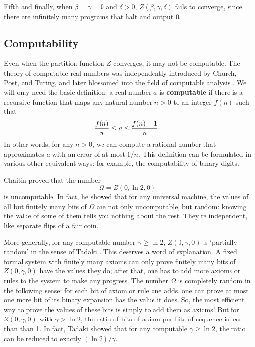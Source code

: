 \documentclass[12pt,twoside,openright]{report}
\begin{document}
Fifth and finally, when $\beta = \gamma = 0$ and $\delta > 0$, 
$Z(\beta,\gamma,\delta)$ fails to converge, since there are infinitely many programs that halt and output 0.

\subsection{Computability} \label{computability}

Even when the partition function $Z$ converges, it may not be computable.  The theory of computable real numbers was independently introduced by Church, Post, and Turing, and later blossomed into the field of computable analysis \cite{PourElRichards}. We will only need the basic definition: a real number $a$ is {\bf computable} if there is a recursive function that maps any natural number $n > 0$ to an integer $f(n)$ such that
\[              \frac{f(n)}{n} \le a \le \frac{f(n)+1}{n}  \raisebox{0.4ex}{.}\]
In other words, for any $n > 0$, we can compute a rational number that approximates $a$ with an error of at most $1/n$.  This definition can be formulated in various other equivalent ways: for example, the computability of binary digits.

Chaitin \cite{Chaitin1975} proved that the number
\[     \Omega = Z(0,\ln 2, 0)  \]
is uncomputable.  In fact, he showed that for any universal machine, the values of all but finitely many bits of $\Omega$ are not only uncomputable, but random: knowing the value of some of them tells you nothing about the rest.  They're independent, like separate flips of a fair coin.

More generally, for any computable number $\gamma \ge \ln 2$, 
$Z(0,\gamma,0)$ is `partially random' in the sense of Tadaki \cite{CST2004,Tadaki2002}. This deserves a word of explanation.  A fixed formal system with finitely many axioms can only prove finitely many bits of 
$Z(0,\gamma,0)$ have the values they do; after that, one has to add more axioms or rules to the system to make any progress. The number $\Omega$ is completely random in the following sense:
for each bit of axiom or rule one adds, one can prove at most one more bit of its binary expansion has the value it does.  So, the most efficient way to prove the values of these bits is simply to add them as axioms!  But for $Z(0,\gamma,0)$ with $\gamma > \ln 2$, the ratio of bits of axiom per bits of sequence is less than than 1. In fact, Tadaki showed that for any computable $\gamma \ge \ln 2$, the ratio can be reduced to exactly $(\ln 2)/\gamma$.
\end{document}
